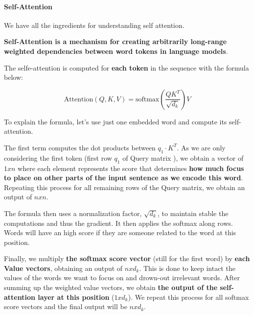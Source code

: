 \paragraph{Self-Attention}
We have all the ingredients for understanding self attention.

\textbf{Self-Attention is a mechanism for creating arbitrarily long-range weighted dependencies between word tokens in language models}.

The selfe-attention is computed for \textbf{each token} in the sequence with the formula below:

\begin{equation}\label{eq: attention}
    \text{Attention}(Q,K,V) = \text{softmax}(\frac{QK^T}{\sqrt{d_k}})V
\end{equation}

To explain the formula, let's use just one embedded word and compute its self-attention.

The first term computes the dot products between $ q_1 \cdot K^T$. As we are only considering the first token (first row $q_1$ of Query matrix ), we obtain a vector of $1xn$ where each element represents the score that determines \textbf{how much focus to place on other parts of the input sentence as we encode this word}. Repeating this process for all remaining rows of the Query matrix, we obtain an output of $nxn$.

The formula then uses a normalization factor, $\sqrt{d_k}$, to maintain stable the computations and thus the gradient. It then applies the softmax along rows. Words will have an high score if they are someone related to the word at this position. 

Finally, we multiply \textbf{ the softmax score vector} (still for the first word) by \textbf{each Value vectors}, obtaining an output of $nxd_k$. This is done to keep intact the values of the words we want to focus on and drown-out irrelevant words. After summing up the weighted
value vectors, we obtain \textbf{the output of the self-attention layer at this position} ($1xd_k$). We repeat this process for all softmax score vectors and the final output will be $nx d_k$.

